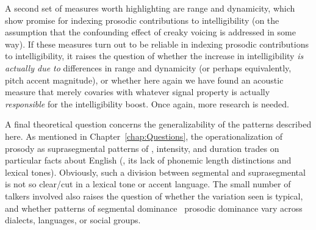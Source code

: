 A second set of measures worth highlighting are \fo{} range and \fo{} dynamicity, which show promise for indexing prosodic contributions to intelligibility (on the assumption that the confounding effect of creaky voicing is addressed in some way).  If these measures turn out to be reliable in indexing prosodic contributions to intelligibility, it raises the question of whether the increase in intelligibility \emph{is actually due to} differences in \fo{} range and dynamicity (or perhaps equivalently, pitch accent magnitude), or whether here again we have found an acoustic measure that merely covaries with whatever signal property is actually \emph{responsible} for the intelligibility boost.  Once again, more research is needed.

A final theoretical question concerns the generalizability of the patterns described here.  As mentioned in Chapter~\ref{chap:Questions}, the operationalization of prosody as suprasegmental patterns of \fo, intensity, and duration trades on particular facts about English (\ie, its lack of phonemic length distinctions and lexical tones).  Obviously, such a division between segmental and suprasegmental is not so clear\-/cut in a lexical tone or accent language.  The small number of talkers involved also raises the question of whether the variation seen is typical, and whether patterns of segmental dominance \vs\ prosodic dominance vary across dialects, languages, or social groups.


